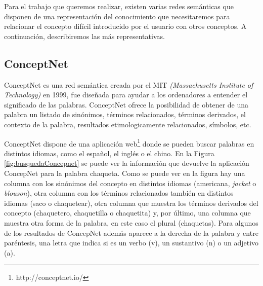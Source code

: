 Para el trabajo que queremos realizar, existen varias redes semánticas que disponen de una representación del conocimiento que necesitaremos para relacionar el concepto difícil introducido por el usuario con otros conceptos. A continuación, describiremos las más representativas.

\subsection{ConceptNet} 
\label{cap:subsec:concepnet}

ConceptNet es una red semántica creada por el MIT \textit{(Massachusetts Institute of Technology)} en 1999, fue diseñada para ayudar a los ordenadores a entender el significado de las palabras. ConceptNet ofrece la posibilidad de obtener de una palabra un listado de sinónimos, términos relacionados, términos derivados, el contexto de la palabra, resultados etimologicamente relacionados, símbolos, etc. 

ConceptNet dispone de una aplicación web\footnote{http://conceptnet.io/} donde se pueden buscar palabras en distintos idiomas,  como el español, el inglés o el chino.
En la Figura \ref{fig:busquedaConcepnet} se puede ver la información que devuelve la aplicación ConcepNet para la palabra chaqueta. Como se puede ver en la figura hay una columna con los sinónimos del concepto  en distintos idiomas (americana, \textit{jacket} o \textit{blouson}), otra columna con los términos relacionados también en distintos idiomas (saco o chaquetear), otra columna que muestra los términos derivados del concepto (chaquetero, chaquetilla o chaquetita) y, por último, una columna que muestra otra forma de la palabra, en este caso el plural (chaquetas).  Para algunos de los resultados de ConcepNet además aparece a la derecha de la palabra y entre paréntesis, una letra que indica si es un verbo (v), un sustantivo (n) o un adjetivo (a). 

